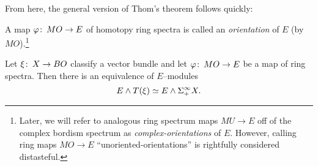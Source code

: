 \noindent From here, the general version of Thom's theorem follows quickly:

\begin{definition}
A map $\varphi\colon\thinspace MO \to E$ of homotopy ring spectra is called an \textit{orientation} of $E$ (by $MO$).\footnote{Later, we will refer to analogous ring spectrum maps $MU \to E$ off of the complex bordism spectrum as \textit{complex-orientations} of $E$.  However, calling ring maps $MO \to E$ ``unoriented-orientations'' is rightfully considered distasteful.}
\end{definition}

\begin{theorem}\label{GeneralThomIsom}
Let $\xi\colon\thinspace X \to BO$ classify a vector bundle and let $\varphi\colon\thinspace MO \to E$ be a map of ring spectra. Then there is an equivalence of $E$--modules \[E \wedge T(\xi) \simeq E \wedge \Sigma^\infty_+ X.\]
\end{theorem}

